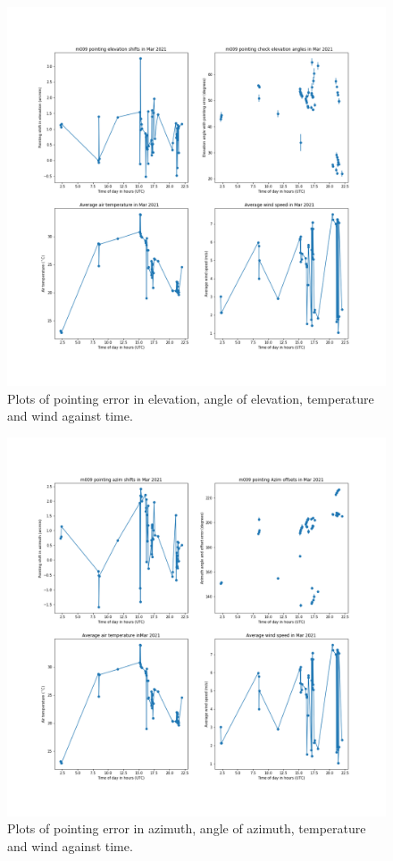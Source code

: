\documentclass{article}
\begin{document}
\begin{figure}[H]
	\centering
	\includegraphics[scale=0.45]{m009_elev_Mar_mapped.png}
	
	\caption{Plots of pointing error in elevation, angle of elevation, temperature and wind against time.}
	\label{fig:m009ElevMarMapped}
\end{figure}

\begin{figure}[H]
	\centering
	\includegraphics[scale=0.45]{m009_azim_Mar_mapped.png}
	
	\caption{Plots of pointing error in azimuth, angle of azimuth, temperature and wind against time.}
	\label{fig:m009AzimMarMapped}
\end{figure}
\end{document}
